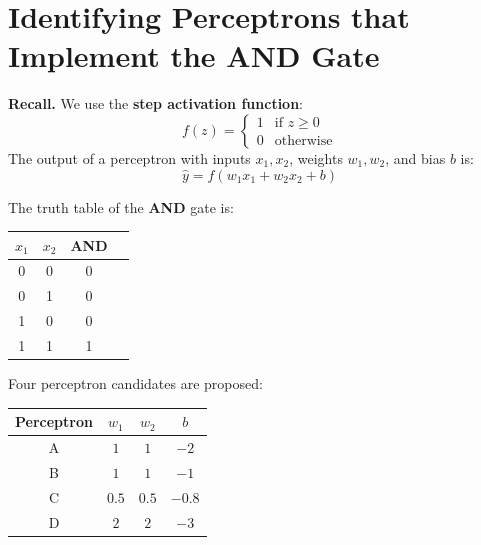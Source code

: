 \documentclass[11pt, a4paper]{article}
\begin{document}


\section{Identifying Perceptrons that Implement the AND Gate}

\begin{notebox}
\textbf{Recall.} We use the \textbf{step activation function}:
\[
  f(z) = \begin{cases} 1 & \text{if } z \geq 0 \\ 0 & \text{otherwise} \end{cases}
\]
The output of a perceptron with inputs $x_1, x_2$, weights $w_1, w_2$, and bias $b$ is:
\[
  \hat{y} = f\!\left(w_1 x_1 + w_2 x_2 + b\right)
\]
\end{notebox}

\vspace{0.5em}

The truth table of the \textbf{AND} gate is:

\vspace{0.4em}
\begin{center}
\begin{tabular}{cccc}
\toprule
$x_1$ & $x_2$ & AND \\
\midrule
0 & 0 & 0 \\
0 & 1 & 0 \\
1 & 0 & 0 \\
1 & 1 & 1 \\
\bottomrule
\end{tabular}
\end{center}

\vspace{0.6em}

Four perceptron candidates are proposed:

\vspace{0.4em}
\begin{center}
\begin{tabular}{cccc}
\toprule
Perceptron & $w_1$ & $w_2$ & $b$ \\
\midrule
A & $1$ & $1$ & $-2$ \\
B & $1$ & $1$ & $-1$ \\
C & $0.5$ & $0.5$ & $-0.8$ \\
D & $2$ & $2$ & $-3$ \\
\bottomrule
\end{tabular}
\end{center}
\end{document}
